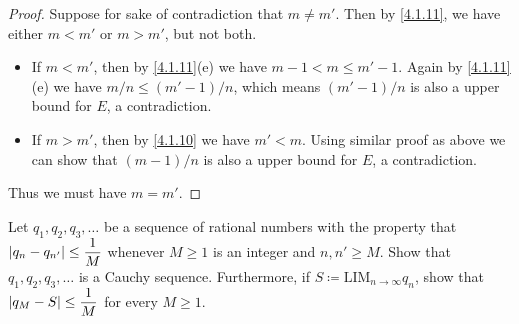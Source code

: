 \begin{proof}
  Suppose for sake of contradiction that \(m \neq m'\).
  Then by \cref{4.1.11}, we have either \(m < m'\) or \(m > m'\), but not both.
  \begin{itemize}
    \item If \(m < m'\), then by \cref{4.1.11}(e) we have \(m - 1 < m \leq m' - 1\).
          Again by \cref{4.1.11}(e) we have \(m / n \leq (m' - 1) / n\), which means \((m' - 1) / n\) is also a upper bound for \(E\), a contradiction.
    \item If \(m > m'\), then by \cref{4.1.10} we have \(m' < m\).
          Using similar proof as above we can show that \((m - 1) / n\) is also a upper bound for \(E\), a contradiction.
  \end{itemize}
  Thus we must have \(m = m'\).
\end{proof}

\begin{ex}\label{ex:5.5.4}
  Let \(q_1, q_2, q_3, \dots\) be a sequence of rational numbers with the property that \(\left\lvert q_n - q_{n'}\right\rvert \leq \dfrac{1}{M}\) whenever \(M \geq 1\) is an integer and \(n, n' \geq M\).
  Show that \(q_1, q_2, q_3, \dots\) is a Cauchy sequence.
  Furthermore, if \(S \coloneqq \text{LIM}_{n \to \infty} q_n\), show that \(\left\lvert q_M - S\right\rvert \leq \dfrac{1}{M}\) for every \(M \geq 1\).
\end{ex}

